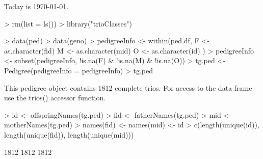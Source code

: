 \documentclass[10pt]{article}
\begin{document}
\setlength{\parskip}{0.2\baselineskip}
\setlength{\parindent}{0pt}
Today is \today.
\begin{Schunk}
\begin{Sinput}
> rm(list = ls())
> library("trioClasses")
\end{Sinput}
\end{Schunk}
\begin{Schunk}
\begin{Sinput}
> data(ped)
> data(geno)
> pedigreeInfo <- within(ped.df, {
     F <- as.character(fid)
     M <- as.character(mid)
     O <- as.character(id)
 })
> pedigreeInfo <- subset(pedigreeInfo, !is.na(F) & !is.na(M) & 
     !is.na(O))
> tg.ped <- Pedigree(pedigreeInfo = pedigreeInfo)
> tg.ped
\end{Sinput}
\begin{Soutput}
This pedigree object contains 1812 complete trios.
For access to the data frame use the trios() accessor function.
\end{Soutput}
\end{Schunk}
\begin{Schunk}
\begin{Sinput}
> id <- offspringNames(tg.ped)
> fid <- fatherNames(tg.ped)
> mid <- motherNames(tg.ped)
> names(fid) <- names(mid) <- id
> c(length(unique(id)), length(unique(fid)), length(unique(mid)))
\end{Sinput}
\begin{Soutput}
[1] 1812 1812 1812
\end{Soutput}
\end{Schunk}
\end{document}
